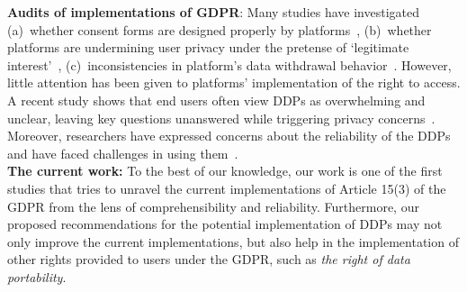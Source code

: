 \noindent
\textbf{Audits of implementations of GDPR}:
Many studies have investigated (a)~whether consent forms are designed properly by platforms~\cite{santos2019cookie, santos2021consent, matte2020cookie, bouhoula2024automated}, (b)~whether platforms are undermining user privacy under the pretense of `legitimate interest'~\cite{smith2024study, kyi2023investigating, kyi2024doesn}, (c)~inconsistencies in platform's data withdrawal behavior~\cite{Du2024Withdraw}.
%
However, little attention has been given to platforms' implementation of the right to access. 
A recent study shows that end users often view DDPs as overwhelming and unclear, leaving key questions unanswered while triggering privacy concerns~\cite{borem2024data}.
Moreover, researchers have expressed concerns about the reliability of the DDPs and have faced challenges in using them~\cite{valkenburg2024time, hase2024fulfilling}.\\
\noindent
\textbf{The current work:} To the best of our knowledge, our work is one of the first studies that tries to unravel the current implementations of Article 15(3) of the GDPR from the lens of comprehensibility and reliability.
Furthermore, our proposed recommendations for the potential implementation of DDPs may not only improve the current implementations, but also help in the implementation of other rights provided to users under the GDPR, such as \textit{the right of data portability}.

